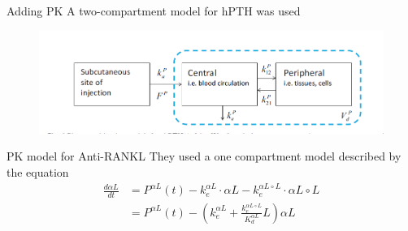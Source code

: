 \documentclass{beamer}
\begin{document}
\begin{frame}{Adding PK}
	A two-compartment model for hPTH was used
	\begin{figure}[h]
	\centering
		\includegraphics[scale=0.45]{../Figures/fig_lemaire_fig6.png}
\end{figure}		
	
\end{frame}
\begin{frame}{PK model for Anti-RANKL}
They used a one compartment model described by the equation
\begin{equation}
	\begin{split}
	\frac{d\alpha L}{dt}&= P^{\alpha L}(t)- k_e^{\alpha L} \cdot \alpha L - k_e^{\alpha L \circ L} \cdot \alpha L \circ L\\
	&=P^{\alpha L}(t)- \left( 
	k_e^{\alpha L}  + \frac{k_e^{\alpha L \circ L}}{K_d^{\alpha L}} L  \right) \alpha L 
	\end{split}
\end{equation}

\end{frame}
\end{document}
